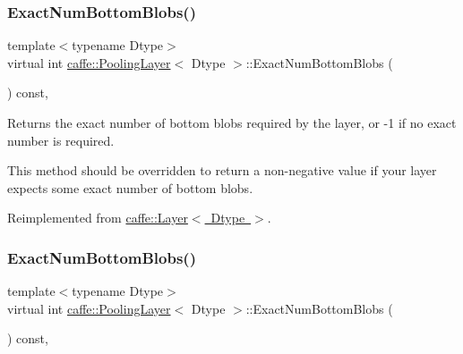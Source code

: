 \subsubsection{\texorpdfstring{Exact\+Num\+Bottom\+Blobs()}{ExactNumBottomBlobs()}\hspace{0.1cm}{\footnotesize\ttfamily [1/2]}}
{\footnotesize\ttfamily template$<$typename Dtype$>$ \\
virtual int \mbox{\hyperlink{classcaffe_1_1_pooling_layer}{caffe\+::\+Pooling\+Layer}}$<$ Dtype $>$\+::Exact\+Num\+Bottom\+Blobs (\begin{DoxyParamCaption}{ }\end{DoxyParamCaption}) const\hspace{0.3cm}{\ttfamily [inline]}, {\ttfamily [virtual]}}



Returns the exact number of bottom blobs required by the layer, or -\/1 if no exact number is required. 

This method should be overridden to return a non-\/negative value if your layer expects some exact number of bottom blobs. 

Reimplemented from \mbox{\hyperlink{classcaffe_1_1_layer_a8e5ee0494d85f5f55fc4396537cbc60f}{caffe\+::\+Layer$<$ Dtype $>$}}.

\mbox{\label{classcaffe_1_1_pooling_layer_a07dc8b1c3bfa3a997dd86b4e53f54019}} 
\subsubsection{\texorpdfstring{Exact\+Num\+Bottom\+Blobs()}{ExactNumBottomBlobs()}\hspace{0.1cm}{\footnotesize\ttfamily [2/2]}}
{\footnotesize\ttfamily template$<$typename Dtype$>$ \\
virtual int \mbox{\hyperlink{classcaffe_1_1_pooling_layer}{caffe\+::\+Pooling\+Layer}}$<$ Dtype $>$\+::Exact\+Num\+Bottom\+Blobs (\begin{DoxyParamCaption}{ }\end{DoxyParamCaption}) const\hspace{0.3cm}{\ttfamily [inline]}, {\ttfamily [virtual]}}



